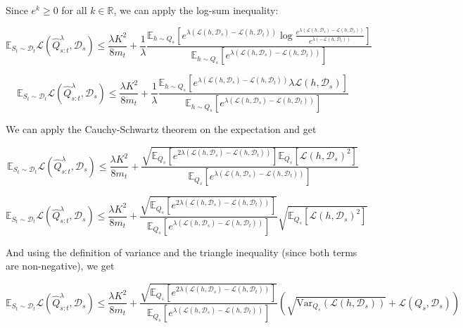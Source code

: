 \documentclass[letterpaper]{article}
\theoremstyle{definition}
\begin{document}
Since $e^k\geq 0$ for all $k\in \mathbb{R}$, we can apply the log-sum inequality:

$$
\mathbb{E}_{S_t\sim \mathcal{D}_t}\mathcal{L}( \hat{Q}^{\lambda}_{s:t},\mathcal{D}_s)\leq \frac{\lambda K^2}{8m_t}+\frac{1}{\lambda}\frac{\mathbb{E}_{h\sim Q_s}\left [e^{\lambda(\mathcal{L}(h,\mathcal{D}_s)-\mathcal{L}(h,\mathcal{D}_t))}\log\frac{e^{\lambda(\mathcal{L}(h,\mathcal{D}_s)-\mathcal{L}(h,\mathcal{D}_t))}}{e^{\lambda(-\mathcal{L}(h,\mathcal{D}_t))}} \right ]}{\mathbb{E}_{h\sim Q_s}\left [e^{\lambda(\mathcal{L}(h,\mathcal{D}_s)-\mathcal{L}(h,\mathcal{D}_t))}\right ]}
$$

$$
\mathbb{E}_{S_t\sim \mathcal{D}_t}\mathcal{L}( \hat{Q}^{\lambda}_{s:t},\mathcal{D}_s)\leq \frac{\lambda K^2}{8m_t}+\frac{1}{\lambda}\frac{\mathbb{E}_{h\sim Q_s}\left [e^{\lambda(\mathcal{L}(h,\mathcal{D}_s)-\mathcal{L}(h,\mathcal{D}_t))}\lambda\mathcal{L}(h,\mathcal{D}_s) \right ]}{\mathbb{E}_{h\sim Q_s}\left [e^{\lambda(\mathcal{L}(h,\mathcal{D}_s)-\mathcal{L}(h,\mathcal{D}_t))}\right ]}
$$

We can apply the Cauchy-Schwartz theorem on the expectation and get

$$
\mathbb{E}_{S_t\sim \mathcal{D}_t}\mathcal{L}( \hat{Q}^{\lambda}_{s:t},\mathcal{D}_s)\leq \frac{\lambda K^2}{8m_t}+\frac{\sqrt{\mathbb{E}_{Q_s}\left [e^{2\lambda(\mathcal{L}(h,\mathcal{D}_s)-\mathcal{L}(h,\mathcal{D}_t))}\right ]\mathbb{E}_{Q_s}\left [\mathcal{L}(h,\mathcal{D}_s)^2 \right ]}}{\mathbb{E}_{Q_s}\left [e^{\lambda(\mathcal{L}(h,\mathcal{D}_s)-\mathcal{L}(h,\mathcal{D}_t))}\right ]}
$$


$$
\mathbb{E}_{S_t\sim \mathcal{D}_t}\mathcal{L}( \hat{Q}^{\lambda}_{s:t},\mathcal{D}_s)\leq \frac{\lambda K^2}{8m_t}+\frac{\sqrt{\mathbb{E}_{Q_s}\left [e^{2\lambda(\mathcal{L}(h,\mathcal{D}_s)-\mathcal{L}(h,\mathcal{D}_t))}\right ]}}{\mathbb{E}_{Q_s}\left [e^{\lambda(\mathcal{L}(h,\mathcal{D}_s)-\mathcal{L}(h,\mathcal{D}_t))}\right ]}\sqrt{\mathbb{E}_{Q_s}\left [\mathcal{L}(h,\mathcal{D}_s)^2 \right ]}
$$

And using the definition of variance and the triangle inequality (since both terms are non-negative), we get

\begin{equation} 
\mathbb{E}_{S_t\sim \mathcal{D}_t}\mathcal{L}( \hat{Q}^{\lambda}_{s:t},\mathcal{D}_s)\leq \frac{\lambda K^2}{8m_t}+\frac{\sqrt{\mathbb{E}_{Q_s}\left [e^{2\lambda(\mathcal{L}(h,\mathcal{D}_s)-\mathcal{L}(h,\mathcal{D}_t))}\right ]}}{\mathbb{E}_{Q_s}\left [e^{\lambda(\mathcal{L}(h,\mathcal{D}_s)-\mathcal{L}(h,\mathcal{D}_t))}\right ]}(\sqrt{\mathrm{Var}_{Q_s}(\mathcal{L}(h,\mathcal{D}_s))}+\mathcal{L}(Q_s,\mathcal{D}_s))
\end{equation}
\end{document}
